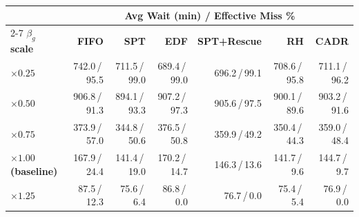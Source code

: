 \begin{tabular}{lrrrrrr}
\toprule
& \multicolumn{6}{c}{\textbf{Avg Wait (min) / Effective Miss \%}} \\
\cmidrule(lr){2-7}
\textbf{$\beta_g$ scale} & \textbf{FIFO} & \textbf{SPT} & \textbf{EDF} & \textbf{SPT+Rescue} & \textbf{RH} & \textbf{CADR} \\
\midrule
$\times0.25$ & 742.0\,/\,95.5 & 711.5\,/\,99.0 & 689.4\,/\,99.0 & 696.2\,/\,99.1 & 708.6\,/\,95.8 & 711.1\,/\,96.2 \\
$\times0.50$ & 906.8\,/\,91.3 & 894.1\,/\,93.3 & 907.2\,/\,97.3 & 905.6\,/\,97.5 & 900.1\,/\,89.6 & 903.2\,/\,91.6 \\
$\times0.75$ & 373.9\,/\,57.0 & 344.8\,/\,50.6 & 376.5\,/\,50.8 & 359.9\,/\,49.2 & 350.4\,/\,44.3 & 359.0\,/\,48.4 \\
$\times1.00$ \textbf{(baseline)} & 167.9\,/\,24.4 & 141.4\,/\,19.0 & 170.2\,/\,14.7 & 146.3\,/\,13.6 & 141.7\,/\,9.6 & 144.7\,/\,9.7 \\
$\times1.25$ & 87.5\,/\,12.3 & 75.6\,/\,6.4 & 86.8\,/\,0.0 & 76.7\,/\,0.0 & 75.4\,/\,5.4 & 76.9\,/\,0.0 \\
\bottomrule
\end{tabular}
